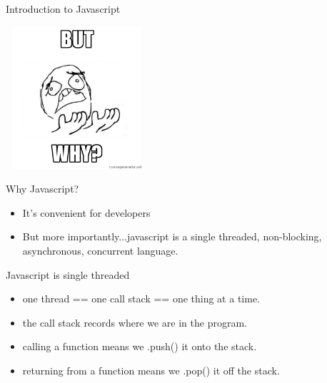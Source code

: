 \documentclass{beamer}
\begin{document}
\begin{frame}{Introduction to Javascript}{}
	\begin{center}
		\includegraphics[width=200px, height=200px]{59809489.jpg}
	\end{center}
\end{frame}

\begin{frame}{Why Javascript?}{}
	\begin{itemize}
		\item It's convenient for developers
		\vspace{3em}
		\pause
		\item But more importantly...javascript is a single threaded,
		non-blocking, asynchronous, concurrent language.
	\end{itemize}
\end{frame}

\begin{frame}{Javascript is single threaded}{}
	\begin{itemize}
		\item one thread == one call stack == one thing at a time.
		\pause
		\vspace{2em}
		\item the call stack records where we are in the program.
		\vspace{2em}
		\pause

		\item calling a function means we .push() it onto the stack.
		\vspace{2em}
		\pause

		\item returning from a function means we .pop() it off the stack.
		\vspace{2em}
	\end{itemize}
\end{frame}
\end{document}

